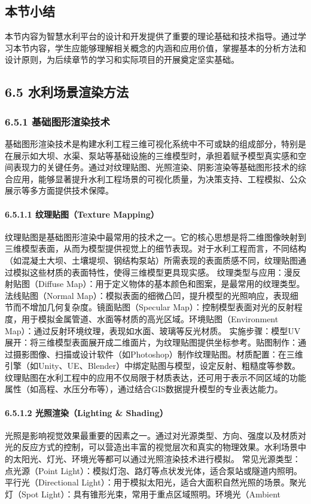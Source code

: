 \subsection{本节小结}\label{ux672cux8282ux5c0fux7ed3} 本节内容为智慧水利平台的设计和开发提供了重要的理论基础和技术指导。通过学习本节内容，学生应能够理解相关概念的内涵和应用价值，掌握基本的分析方法和设计原则，为后续章节的学习和实际项目的开展奠定坚实基础。

\subsection{6.5 水利场景渲染方法}\label{ux6c34ux5229ux573aux666fux6e32ux67d3ux65b9ux6cd5} \subsubsection{6.5.1 基础图形渲染技术}\label{ux57faux7840ux56feux5f62ux6e32ux67d3ux6280ux672f} 基础图形渲染技术是构建水利工程三维可视化系统中不可或缺的组成部分，特别是在展示如大坝、水渠、泵站等基础设施的三维模型时，承担着赋予模型真实感和空间表现力的关键任务。通过对纹理贴图、光照渲染、阴影渲染等基础图形技术的综合应用，能够显著提升水利工程场景的可视化质量，为决策支持、工程模拟、公众展示等多方面提供技术保障。 \paragraph{6.5.1.1 纹理贴图（Texture Mapping）}\label{ux7eb9ux7406ux8d34ux56fetexture-mapping} 纹理贴图是基础图形渲染中最常用的技术之一。它的核心思想是将二维图像映射到三维模型表面，从而为模型提供视觉上的细节表现。对于水利工程而言，不同结构（如混凝土大坝、土壤堤坝、钢结构泵站）所需表现的表面质感不同，纹理贴图通过模拟这些材质的表面特性，使得三维模型更具现实感。 纹理类型与应用：漫反射贴图（Diffuse Map）：用于定义物体的基本颜色和图案，是最常用的纹理类型。法线贴图（Normal Map）：模拟表面的细微凸凹，提升模型的光照响应，表现细节而不增加几何复杂度。镜面贴图（Specular Map）：控制模型表面对光的反射程度，用于模拟金属管道、水面等材质的高光区域。环境贴图（Environment Map）：通过反射环境纹理，表现如水面、玻璃等反光材质。 实施步骤：模型UV展开：将三维模型表面展开成二维面片，为纹理贴图提供坐标参考。贴图制作：通过摄影图像、扫描或设计软件（如Photoshop）制作纹理贴图。材质配置：在三维引擎（如Unity、UE、Blender）中绑定贴图与模型，设定反射、粗糙度等参数。纹理贴图在水利工程中的应用不仅局限于材质表达，还可用于表示不同区域的功能属性（如高程、水压分布等），通过结合GIS数据提升模型的专业表达能力。 \paragraph{6.5.1.2 光照渲染（Lighting \& Shading）}\label{ux5149ux7167ux6e32ux67d3lighting-shading} 光照是影响视觉效果最重要的因素之一。通过对光源类型、方向、强度以及材质对光的反应方式的控制，可以营造出丰富的视觉层次和真实的物理效果。水利场景中的太阳光、灯光、环境光等都可以通过光照渲染技术进行模拟。 常见光源类型：点光源（Point Light）：模拟灯泡、路灯等点状发光体，适合泵站或隧道内照明。平行光（Directional Light）：用于模拟太阳光，适合大面积自然光照的场景。聚光灯（Spot Light）：具有锥形光束，常用于重点区域照明。环境光（Ambient 